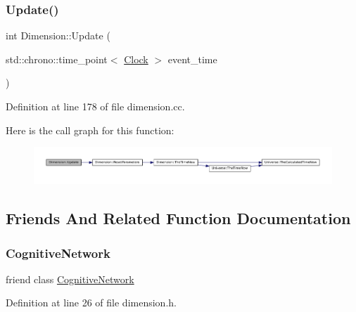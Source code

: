 \subsubsection{\texorpdfstring{Update()}{Update()}}
{\footnotesize\ttfamily int Dimension\+::\+Update (\begin{DoxyParamCaption}\item[{std\+::chrono\+::time\+\_\+point$<$ \mbox{\hyperlink{universe_8h_a0ef8d951d1ca5ab3cfaf7ab4c7a6fd80}{Clock}} $>$}]{event\+\_\+time }\end{DoxyParamCaption})}



Definition at line 178 of file dimension.\+cc.

Here is the call graph for this function\+:\nopagebreak
\begin{figure}[H]
\begin{center}
\leavevmode
\includegraphics[width=350pt]{class_dimension_a663916c2573b6df4db02ccee5678a75d_cgraph}
\end{center}
\end{figure}


\subsection{Friends And Related Function Documentation}
\mbox{\label{class_dimension_ad04bbaef84caa0d408ec09a1c1302f5f}} 
\subsubsection{\texorpdfstring{Cognitive\+Network}{CognitiveNetwork}}
{\footnotesize\ttfamily friend class \mbox{\hyperlink{class_cognitive_network}{Cognitive\+Network}}\hspace{0.3cm}{\ttfamily [friend]}}



Definition at line 26 of file dimension.\+h.

\mbox{\label{class_dimension_a1dacbeca8e464bdc533a40a1b18f33b2}} 
